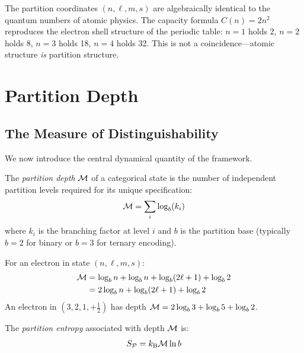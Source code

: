 \begin{remark}
The partition coordinates $(n, \ell, m, s)$ are algebraically identical to the quantum numbers of atomic physics. The capacity formula $C(n) = 2n^2$ reproduces the electron shell structure of the periodic table: $n=1$ holds 2, $n=2$ holds 8, $n=3$ holds 18, $n=4$ holds 32. This is not a coincidence---atomic structure \emph{is} partition structure.
\end{remark}

\section{Partition Depth}
\label{sec:depth}

\subsection{The Measure of Distinguishability}

We now introduce the central dynamical quantity of the framework.

\begin{definition}
\label{def:depth}
The \emph{partition depth} $\mathcal{M}$ of a categorical state is the number of independent partition levels required for its unique specification:
\begin{equation}
    \mathcal{M} = \sum_{i} \log_b(k_i)
\end{equation}
where $k_i$ is the branching factor at level $i$ and $b$ is the partition base (typically $b = 2$ for binary or $b = 3$ for ternary encoding).
\end{definition}

\begin{example}
For an electron in state $(n, \ell, m, s)$:
\begin{align}
    \mathcal{M} &= \log_b n + \log_b n + \log_b(2\ell + 1) + \log_b 2 \nonumber \\
           &= 2\log_b n + \log_b(2\ell + 1) + \log_b 2
\end{align}
An electron in $(3, 2, 1, +\tfrac{1}{2})$ has depth $\mathcal{M} = 2\log_b 3 + \log_b 5 + \log_b 2$.
\end{example}

\begin{definition}
\label{def:partition_entropy}
The \emph{partition entropy} associated with depth $\mathcal{M}$ is:
\begin{equation}
    S_{\mathcal{P}} = k_{\mathrm{B}} \mathcal{M} \ln b
\end{equation}
\end{definition}

